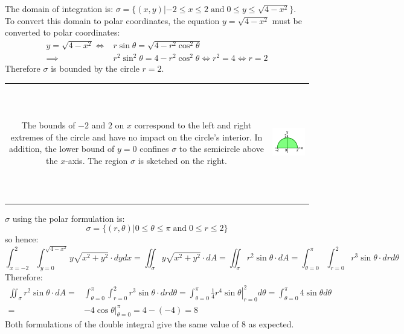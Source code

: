 \documentclass{article}
\newcommand{\at}[1]{\left. #1 \right|}
\newcommand{\dr}[1]{\textcolor{dark_red}{#1}}
\begin{document}
\dr{
The domain of integration is: \(\sigma = \{(x,y) | -2 \leq x \leq 2 \;\text{and}\; 0 \leq y \leq \sqrt{4 - x^2}\}\). \\
To convert this domain to polar coordinates, the equation \(y = \sqrt{4 - x^2}\) must be converted to polar coordinates:
\begin{align*}
y = \sqrt{4 - x^2} 
\iff & r\sin\theta = \sqrt{4 - r^2\cos^2\theta} \\
\implies & r^2\sin^2\theta = 4 - r^2\cos^2\theta 
\iff r^2 = 4 
\iff r = 2
\end{align*}
Therefore \(\sigma\) is bounded by the circle \(r = 2\). \\
\begin{tabular}{cc}
\parbox{0.6\textwidth}{
The bounds of \(-2\) and \(2\) on \(x\) correspond to the left and right extremes of the circle and have no impact on the circle's interior. In addition, the lower bound of \(y = 0\) confines \(\sigma\) to the semicircle above the \(x\)-axis. The region \(\sigma\) is sketched on the right.
} & 
\parbox{0.4\textwidth}{
\includegraphics[height = 5cm]{Test_bench_part_3_images/Test_bench_part_3_Solutions_image_3}
}
\end{tabular}
\(\sigma\) using the polar formulation is: 
\[\sigma = \{(r,\theta) | 0 \leq \theta \leq \pi \;\text{and}\; 0 \leq r \leq 2\}\]
so hence:
\[\int_{x = -2}^2 \int_{y = 0}^{\sqrt{4-x^2}} y\sqrt{x^2 + y^2} \cdot dydx 
= \iint_{\sigma} y\sqrt{x^2 + y^2} \cdot dA
= \iint_{\sigma} r^2\sin\theta \cdot dA 
= \int_{\theta = 0}^{\pi} \int_{r = 0}^2 r^3\sin\theta \cdot drd\theta\]
Therefore:
\begin{align*}
\iint_{\sigma} r^2\sin\theta \cdot dA 
= & \int_{\theta = 0}^{\pi} \int_{r = 0}^2 r^3\sin\theta \cdot drd\theta 
= \int_{\theta = 0}^{\pi} \at{\frac{1}{4}r^4 \sin\theta}_{r = 0}^2 d\theta 
= \int_{\theta = 0}^{\pi} 4\sin\theta d\theta \\
= & \at{-4\cos\theta}_{\theta = 0}^{\pi}
= 4 - (-4) 
= 8
\end{align*}
Both formulations of the double integral give the same value of \(8\) as expected. 
}
\end{document}
